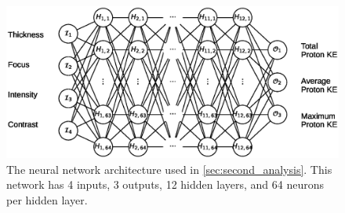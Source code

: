 \begin{figure}
	\centering 
	\includegraphics[width=0.95\linewidth]{planning/images/nn_architecture2.eps}
	\caption{The neural network architecture used in \autoref{sec:second_analysis}. This network has 4 inputs, 3 outputs, 12 hidden layers, and 64 neurons per hidden layer.}
	\label{fig:nn_arch}
\end{figure}
